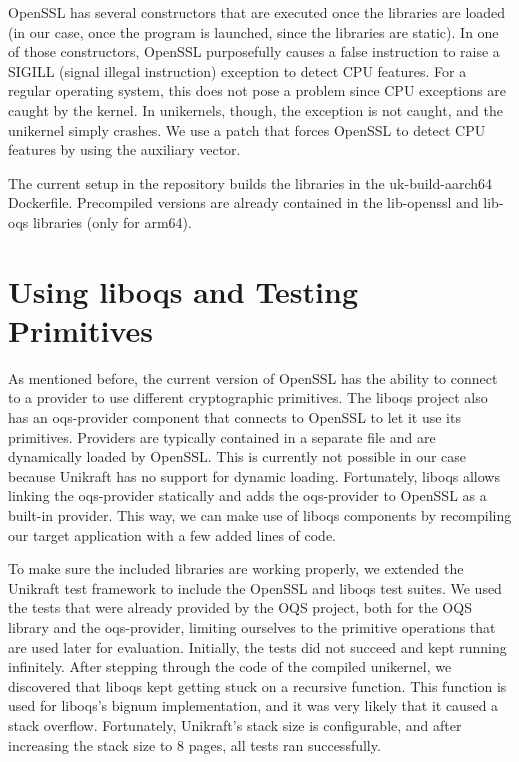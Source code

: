 \documentclass[public,noindent]{aisecreport}
\begin{document}
OpenSSL has several constructors that are executed once the libraries are loaded (in our case, once the program is launched, since the libraries are static). In one of those constructors, OpenSSL purposefully causes a false instruction to raise a SIGILL (signal illegal instruction) exception to detect CPU features. For a regular operating system, this does not pose a problem since CPU exceptions are caught by the kernel. In unikernels, though, the exception is not caught, and the unikernel simply crashes. We use a patch that forces OpenSSL to detect CPU features by using the auxiliary vector.

The current setup in the repository builds the libraries in the uk-build-aarch64 Dockerfile. Precompiled versions are already contained in the lib-openssl and lib-oqs libraries (only for arm64). 

\section{Using liboqs and Testing Primitives}

As mentioned before, the current version of OpenSSL has the ability to connect to a provider to use different cryptographic primitives. The liboqs project also has an oqs-provider component that connects to OpenSSL to let it use its primitives. Providers are typically contained in a separate file and are dynamically loaded by OpenSSL. This is currently not possible in our case because Unikraft has no support for dynamic loading. Fortunately, liboqs allows linking the oqs-provider statically and adds the oqs-provider to OpenSSL as a built-in provider. This way, we can make use of liboqs components by recompiling our target application with a few added lines of code.

To make sure the included libraries are working properly, we extended the Unikraft test framework to include the OpenSSL and liboqs test suites. We used the tests that were already provided by the OQS project, both for the OQS library and the oqs-provider, limiting ourselves to the primitive operations that are used later for evaluation. Initially, the tests did not succeed and kept running infinitely. After stepping through the code of the compiled unikernel, we discovered that liboqs kept getting stuck on a recursive function. This function is used for liboqs's bignum implementation, and it was very likely that it caused a stack overflow. Fortunately, Unikraft's stack size is configurable, and after increasing the stack size to 8 pages, all tests ran successfully. 
\end{document}
